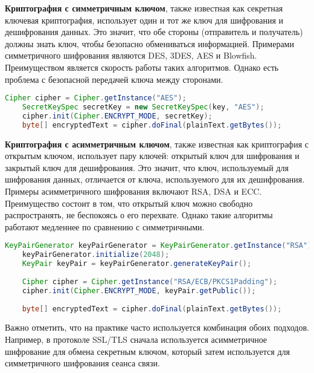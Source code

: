 \textbf{Криптография с симметричным ключом}, также известная как секретная ключевая криптография, использует один и тот же ключ для шифрования и дешифрования данных. Это значит, что обе стороны (отправитель и получатель) должны знать ключ, чтобы безопасно обмениваться информацией. Примерами симметричного шифрования являются DES, 3DES, AES и Blowfish. Преимуществом является скорость работы таких алгоритмов. Однако есть проблема с безопасной передачей ключа между сторонами.


\begin{lstlisting}[language=Java]
    Cipher cipher = Cipher.getInstance("AES");
    SecretKeySpec secretKey = new SecretKeySpec(key, "AES");
    cipher.init(Cipher.ENCRYPT_MODE, secretKey);
    byte[] encryptedText = cipher.doFinal(plainText.getBytes());
    \end{lstlisting}

\textbf{Криптография с асимметричным ключом}, также известная как криптография с открытым ключом, использует пару ключей: открытый ключ для шифрования и закрытый ключ для дешифрования. Это значит, что ключ, используемый для шифрования данных, отличается от ключа, используемого для их дешифрования. Примеры асимметричного шифрования включают RSA, DSA и ECC. Преимущество состоит в том, что открытый ключ можно свободно распространять, не беспокоясь о его перехвате. Однако такие алгоритмы работают медленнее по сравнению с симметричными.

\begin{lstlisting}[language=Java]
    KeyPairGenerator keyPairGenerator = KeyPairGenerator.getInstance("RSA");
    keyPairGenerator.initialize(2048);
    KeyPair keyPair = keyPairGenerator.generateKeyPair();
    
    Cipher cipher = Cipher.getInstance("RSA/ECB/PKCS1Padding");
    cipher.init(Cipher.ENCRYPT_MODE, keyPair.getPublic());
    
    byte[] encryptedText = cipher.doFinal(plainText.getBytes());
    \end{lstlisting}

    Важно отметить, что на практике часто используется комбинация обоих подходов. Например, в протоколе SSL/TLS сначала используется асимметричное шифрование для обмена секретным ключом, который затем используется для симметричного шифрования сеанса связи.






    
